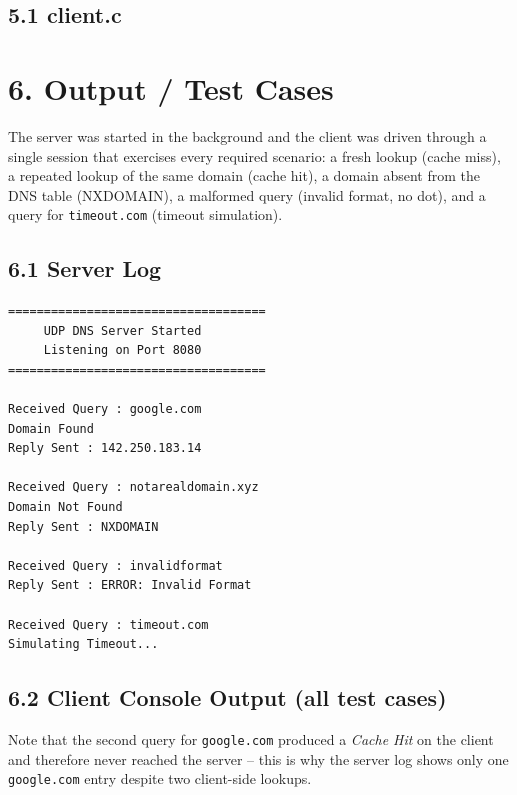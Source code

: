 \documentclass[11pt]{article}
\begin{document}
\subsection*{5.1 client.c}


\section*{6. Output / Test Cases}
The server was started in the background and the client was driven through a single session
that exercises every required scenario: a fresh lookup (cache miss), a repeated lookup of the
same domain (cache hit), a domain absent from the DNS table (NXDOMAIN), a malformed query
(invalid format, no dot), and a query for \texttt{timeout.com} (timeout simulation).

\subsection*{6.1 Server Log}
\begin{lstlisting}[style=outstyle]
====================================
     UDP DNS Server Started
     Listening on Port 8080
====================================

Received Query : google.com
Domain Found
Reply Sent : 142.250.183.14

Received Query : notarealdomain.xyz
Domain Not Found
Reply Sent : NXDOMAIN

Received Query : invalidformat
Reply Sent : ERROR: Invalid Format

Received Query : timeout.com
Simulating Timeout...
\end{lstlisting}

\subsection*{6.2 Client Console Output (all test cases)}


Note that the second query for \texttt{google.com} produced a \emph{Cache Hit} on the client
and therefore never reached the server -- this is why the server log shows only one
\texttt{google.com} entry despite two client-side lookups.
\end{document}
